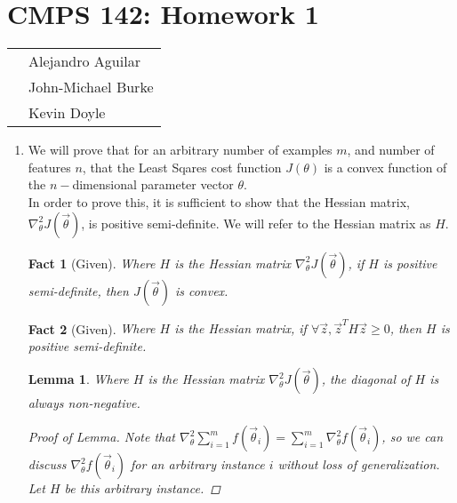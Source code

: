 \documentclass[12pt]{article}
\newtheorem{fact}{Fact}
\newtheorem*{lemma}{Lemma}
\begin{document}
\section*{CMPS 142: Homework 1}

\begin{tabular}{p{10cm} l}
    & Alejandro Aguilar \\
    & John-Michael Burke \\
    & Kevin Doyle \\
\end{tabular}
    
\begin{enumerate}
  \item We will prove that for an arbitrary number of examples $m$, and number of features $n$, that the Least Sqares cost function $J(\theta)$ is a convex function of the $n-$dimensional parameter vector $\theta$. \\
  In order to prove this, it is sufficient to show that the Hessian matrix, $\nabla_{\theta}^2 J(\vec{\theta})$, is positive semi-definite. We will refer to the Hessian matrix as $H$.
  
  \begin{fact}[Given]
   Where $H$ is the Hessian matrix $\nabla_{\theta}^2 J(\vec{\theta})$, if $H$ is positive semi-definite, then $J(\vec{\theta})$ is convex.
  \end{fact}
  \begin{fact}[Given]
   Where $H$ is the Hessian matrix, if $\forall \vec{z}, \vec{z}^T H \vec{z} \geq 0$, then $H$ is positive semi-definite.
  \end{fact}
  \begin{lemma}
  Where $H$ is the Hessian matrix $\nabla_{\theta}^2 J(\vec{\theta})$, the diagonal of $H$ is always non-negative. 
  
  	\begin{proof}[Proof of Lemma]
  	Note that $\nabla_{\theta}^2\sum_{i = 1}^{m} f(\vec{\theta}_i) = \sum_{i = 1}^{m}\nabla_{\theta}^2 f(\vec{\theta}_i)$, so we can discuss $\nabla_{\theta}^2 f(\vec{\theta}_i)$ for an arbitrary instance $i$ without loss of generalization. Let $H$ be this arbitrary instance.
  	

\end{proof}
\end{lemma}
\end{enumerate}
\end{document}
